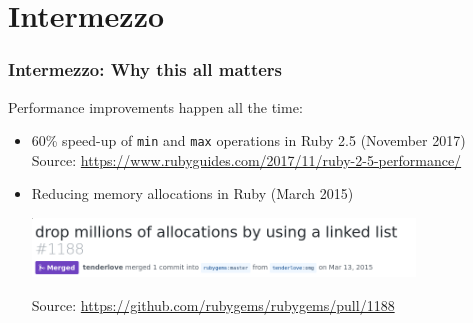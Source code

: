 \section{Intermezzo}
\label{sec:intermezzo}

\begin{frame}
	\frametitle{Intermezzo: Why this all matters}
	
	Performance improvements happen all the time:
	\begin{itemize}
		\item 60\% speed-up of \texttt{min} and \texttt{max} operations in Ruby 2.5 (November 2017)\\
			{\scriptsize Source: \url{https://www.rubyguides.com/2017/11/ruby-2-5-performance/}}
			\pause
		\item Reducing memory allocations in Ruby (March 2015)
			\begin{center}
				\includegraphics[width=0.8\textwidth]{figures/millions.png}\\
			\end{center}
			{\scriptsize Source: \url{https://github.com/rubygems/rubygems/pull/1188}}
	\end{itemize}
	
\end{frame}

